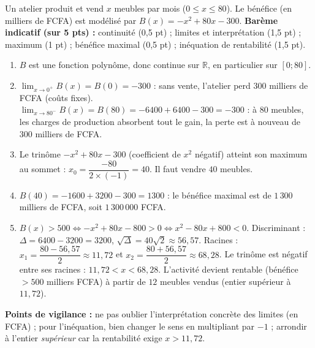 \documentclass[11pt]{article}
\begin{document}
\begin{exoresolu}
Un atelier produit et vend $x$ meubles par mois ($0\le x\le 80$). Le bénéfice (en milliers de FCFA) est modélisé par $B(x)=-x^2+80x-300$.
\textbf{Barème indicatif (sur 5 pts) :} continuité (0,5 pt) ; limites et interprétation (1,5 pt) ; maximum (1 pt) ; bénéfice maximal (0,5 pt) ; inéquation de rentabilité (1,5 pt).
\begin{enumerate}
\item $B$ est une fonction polynôme, donc continue sur $\mathbb{R}$, en particulier sur $[0;80]$.
\item $\lim_{x\to 0^+}B(x)=B(0)=-300$ : sans vente, l'atelier perd $300$ milliers de FCFA (coûts fixes). $\lim_{x\to 80^-}B(x)=B(80)=-6400+6400-300=-300$ : à $80$ meubles, les charges de production absorbent tout le gain, la perte est à nouveau de $300$ milliers de FCFA.
\item Le trinôme $-x^2+80x-300$ (coefficient de $x^2$ négatif) atteint son maximum au sommet : $x_0=\dfrac{-80}{2\times(-1)}=40$. Il faut vendre $40$ meubles.
\item $B(40)=-1600+3200-300=1300$ : le bénéfice maximal est de $1\,300$ milliers de FCFA, soit $1\,300\,000$ FCFA.
\item $B(x)>500\iff -x^2+80x-800>0\iff x^2-80x+800<0$. Discriminant : $\Delta=6400-3200=3200$, $\sqrt{\Delta}=40\sqrt{2}\approx 56,57$. Racines : $x_1=\dfrac{80-56,57}{2}\approx 11,72$ et $x_2=\dfrac{80+56,57}{2}\approx 68,28$. Le trinôme est négatif entre ses racines : $11,72<x<68,28$. L'activité devient rentable (bénéfice $>500$ milliers FCFA) à partir de $\boxed{12}$ meubles vendus (entier supérieur à $11,72$).
\end{enumerate}
\textbf{Points de vigilance :} ne pas oublier l'interprétation concrète des limites (en FCFA) ; pour l'inéquation, bien changer le sens en multipliant par $-1$ ; arrondir à l'entier \emph{supérieur} car la rentabilité exige $x>11,72$.
\end{exoresolu}
\end{document}

